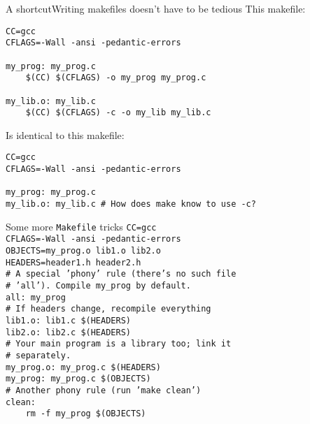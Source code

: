 \documentclass{beamer}
\begin{document}
\begin{frame}{A shortcut}{Writing makefiles doesn't have to be tedious}
\small
This makefile:

\texttt{CC=gcc \\
CFLAGS=-Wall -ansi -pedantic-errors \\
~\\
my\_prog: my\_prog.c \\
~~~~\$(CC) \$(CFLAGS) -o my\_prog my\_prog.c \\
~\\
my\_lib.o: my\_lib.c \\
~~~~\$(CC) \$(CFLAGS) -c -o my\_lib my\_lib.c \\
}

Is identical to this makefile:

\texttt{CC=gcc \\
CFLAGS=-Wall -ansi -pedantic-errors \\
~\\
my\_prog: my\_prog.c \\
my\_lib.o: my\_lib.c  \# How does make know to use -c?\\
}
\end{frame}

\begin{frame}{Some more \texttt{Makefile} tricks}
\footnotesize
\texttt{CC=gcc \\
CFLAGS=-Wall -ansi -pedantic-errors \\
OBJECTS=my\_prog.o lib1.o lib2.o \\
HEADERS=header1.h header2.h \\
\# A special 'phony' rule (there's no such file \\
\# 'all'). Compile my\_prog by default. \\
all: my\_prog \\
\# If headers change, recompile everything\\
lib1.o: lib1.c \$(HEADERS) \\
lib2.o: lib2.c \$(HEADERS) \\
\# Your main program is a library too; link it \\
\# separately. \\
my\_prog.o: my\_prog.c \$(HEADERS) \\
my\_prog: my\_prog.c \$(OBJECTS) \\
\# Another phony rule (run 'make clean') \\
clean: \\
~~~~rm -f my\_prog \$(OBJECTS)
}
\end{frame}
\end{document}
